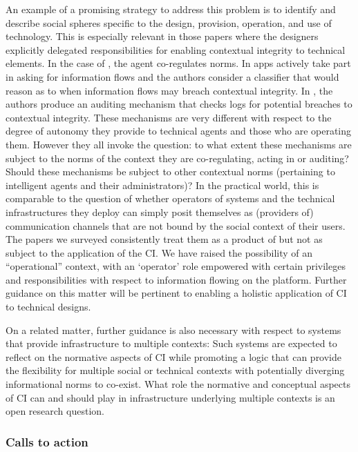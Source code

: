 \documentclass[../thesis.tex]{subfiles}
\begin{document}
An example of a promising strategy to address this problem is to
identify and describe social spheres specific to the design, provision,
operation, and use of technology. This is especially relevant in those
papers where the designers explicitly delegated responsibilities for
enabling contextual integrity to technical elements. In the case of
\citet{criado2015implicit}, the agent co-regulates norms.
In \citet{wijesekera2015android} apps actively take
part in asking for information flows
and the authors consider a classifier that would reason as to when
information flows may breach contextual integrity.
In \citet{samavi2012l2tap+}, the
authors produce an auditing mechanism that checks logs for potential
breaches to contextual integrity. These mechanisms are very different
with respect to the degree of autonomy they provide to technical agents
and those who are operating them. However they all invoke the question:
to what extent these mechanisms are subject to the norms of the context
they are co-regulating, acting in or auditing? Should these mechanisms
be subject to other contextual norms (pertaining to intelligent agents
and their administrators)? In the practical world, this is comparable
to the question of whether operators of systems and the technical
infrastructures they deploy can simply posit themselves as (providers
of) communication channels that are not bound by the social context of
their users. The papers we surveyed consistently treat them as a
product of but not as subject to the application of the CI. We have
raised the possibility of an
``operational'' context, with an
`operator' role empowered with certain
privileges and responsibilities with respect to information flowing on
the platform. Further guidance on this matter will be pertinent to
enabling a holistic application of CI to technical designs.

On a related matter, further guidance is also necessary with respect to
systems that provide infrastructure to multiple contexts: Such
systems are expected to reflect on the normative aspects of CI while
promoting a logic that can provide the flexibility for multiple social
or technical contexts with potentially diverging informational norms to
co-exist. What role the normative and conceptual aspects of CI can and
should play in infrastructure underlying multiple contexts is an open
research question.

\subsubsection{Calls to action}
\label{CI5.1.2}
\end{document}
